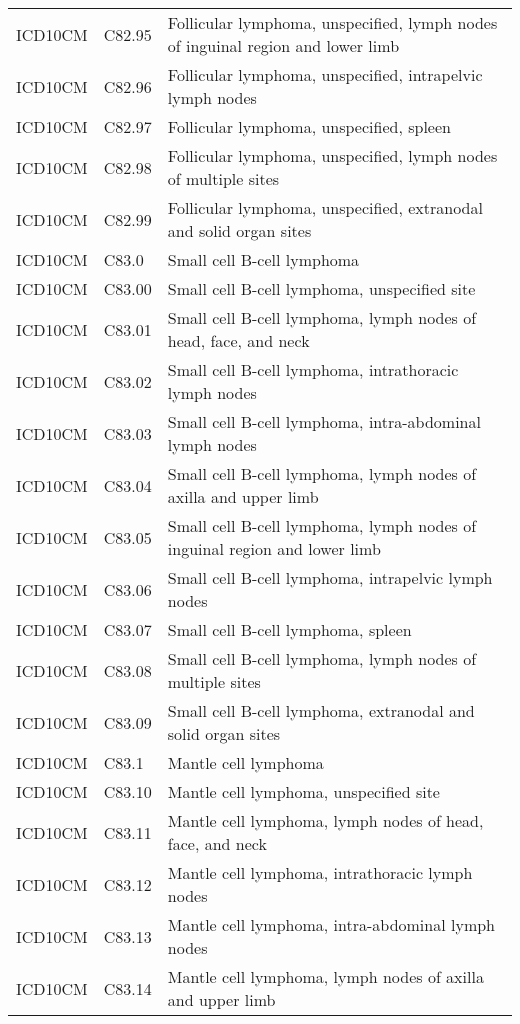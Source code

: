 \begin{longtable}{p{}p{}p{}}
  ICD10CM & C82.95 & Follicular lymphoma, unspecified, lymph nodes of inguinal region and lower limb \\ 
  ICD10CM & C82.96 & Follicular lymphoma, unspecified, intrapelvic lymph nodes \\ 
  ICD10CM & C82.97 & Follicular lymphoma, unspecified, spleen \\ 
  ICD10CM & C82.98 & Follicular lymphoma, unspecified, lymph nodes of multiple sites \\ 
  ICD10CM & C82.99 & Follicular lymphoma, unspecified, extranodal and solid organ sites \\ 
  ICD10CM & C83.0 & Small cell B-cell lymphoma \\ 
  ICD10CM & C83.00 & Small cell B-cell lymphoma, unspecified site \\ 
  ICD10CM & C83.01 & Small cell B-cell lymphoma, lymph nodes of head, face, and neck \\ 
  ICD10CM & C83.02 & Small cell B-cell lymphoma, intrathoracic lymph nodes \\ 
  ICD10CM & C83.03 & Small cell B-cell lymphoma, intra-abdominal lymph nodes \\ 
  ICD10CM & C83.04 & Small cell B-cell lymphoma, lymph nodes of axilla and upper limb \\ 
  ICD10CM & C83.05 & Small cell B-cell lymphoma, lymph nodes of inguinal region and lower limb \\ 
  ICD10CM & C83.06 & Small cell B-cell lymphoma, intrapelvic lymph nodes \\ 
  ICD10CM & C83.07 & Small cell B-cell lymphoma, spleen \\ 
  ICD10CM & C83.08 & Small cell B-cell lymphoma, lymph nodes of multiple sites \\ 
  ICD10CM & C83.09 & Small cell B-cell lymphoma, extranodal and solid organ sites \\ 
  ICD10CM & C83.1 & Mantle cell lymphoma \\ 
  ICD10CM & C83.10 & Mantle cell lymphoma, unspecified site \\ 
  ICD10CM & C83.11 & Mantle cell lymphoma, lymph nodes of head, face, and neck \\ 
  ICD10CM & C83.12 & Mantle cell lymphoma, intrathoracic lymph nodes \\ 
  ICD10CM & C83.13 & Mantle cell lymphoma, intra-abdominal lymph nodes \\ 
  ICD10CM & C83.14 & Mantle cell lymphoma, lymph nodes of axilla and upper limb \\ 

\end{longtable}
